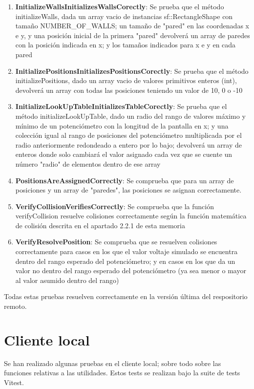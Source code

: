 \documentclass[12pt,a4paper,twoside,openright]{book}
\begin{document}
\begin{enumerate}
\item \textbf{InitializeWallsInitializesWallsCorectly}: Se prueba que el método initializeWalls, dada un array vacio de instancias sf::RectangleShape con tamaño NUMBER\_OF\_WALLS; un tamaño de "pared" en las coordenadas x e y, y una posición inicial de la primera "pared" devolverá un array de paredes con la posición indicada en x; y los tamaños indicados para x e y en cada pared
\item \textbf{InitializePositionsInitializesPositionsCorectly}: Se prueba que el método initializePositions, dado un array vacio de valores primitivos enteros (int), devolverá un array con todas las posiciones teniendo un valor de 10, 0 o -10
\item \textbf{InitializeLookUpTableInitializesTableCorectly}: Se prueba que el método initializeLookUpTable, dado un radio del rango de valores máximo y mínimo de un potenciómetro con la longitud de la pantalla en x; y una colección igual al rango de posiciones del potenciómetro multiplicada por el radio anteriormente redondeado a entero por lo bajo; devolverá un array de enteros donde solo cambiará el valor asignado cada vez que se cuente un número "radio" de elementos dentro de ese array
\item \textbf{PositionsAreAssignedCorrectly}: Se comprueba que para un array de posiciones y un array de "paredes", las posiciones se asignan correctamente.
\item \textbf{VerifyCollisionVerifiesCorrectly}: Se comprueba que la función verifyCollision resuelve colisiones correctamente según la función matemática de colisión descrita en el apartado 2.2.1 de esta memoria
\item \textbf{VerifyResolvePosition}: Se comprueba que se resuelven colisiones correctamente para casos en los que el valor voltaje simulado se encuentra dentro del rango esperado del potenciómetro; y en casos en los que da un valor no dentro del rango esperado del potenciómetro (ya sea menor o mayor al valor asumido dentro del rango)
\end{enumerate}

Todas estas pruebas resuelven correctamente en la versión última del respositorio remoto.

\section{Cliente local}

Se han realizado algunas pruebas en el cliente local; sobre todo sobre las funciones relativas a las utilidades. Estos tests se realizan bajo la suite de tests Vitest.
\end{document}
